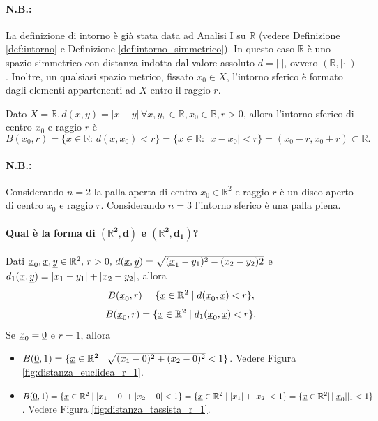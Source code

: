 \paragraph{N.B.:} La definizione di intorno è già stata data ad Analisi I su $\mathbb R$ (vedere Definizione \ref{def:intorno} e Definizione \ref{def:intorno_simmetrico}). In questo caso $\mathbb R$ è uno spazio simmetrico con distanza indotta dal valore assoluto $d=|\cdot|$, ovvero $(\mathbb R,|\cdot|)$. Inoltre, un qualsiasi spazio metrico, fissato $x_0\in X$, l'intorno sferico è formato dagli elementi appartenenti ad $X$ entro il raggio $r$.

\begin{example}
    Dato $X=\mathbb R.\, d(x,y)=|x-y|\,\forall x,y,\in\mathbb R, x_0\in\mathbb B, r>0$, allora l'intorno sferico di centro $x_0$ e raggio $r$ è
    \begin{equation*}
        B(x_0,r)=\{x\in\mathbb R\colon\,d(x,x_0)<r\}=\{x\in\mathbb R\colon\,|x-x_0|<r\}=(x_0 - r, x_0 + r)\subset\mathbb R.
    \end{equation*}
\end{example}

\paragraph{N.B.:} Considerando $n=2$ la palla aperta di centro $x_0\in\mathbb R^2$ e raggio $r$ è un disco aperto di centro $x_0$ e raggio $r$. Considerando $n=3$ l'intorno sferico è una palla piena.

\paragraph{Qual è la forma di $\boldsymbol{(\mathbb R^2, d)}$ e $\boldsymbol{(\mathbb R^2, d_1)}$?}
Dati $\uline x_0, \uline x, \uline y\in\mathbb R^2,\, r>0,\, d(\uline x, \uline y)=\sqrt{(\uline x_1-y_1)^2-(x_2-y_2)2}$ e $ d_1(\uline x,\uline y)=|x_1-y_1|+|x_2-y_2|$, allora 
\begin{equation*}
    B(\uline x_0,r)=\{\uline x\in\mathbb R^2\; | \; d(\uline x_0, \uline x)<r\},
\end{equation*}
\begin{equation*}
    B(\uline x_0,r)=\{\uline x\in\mathbb R^2\; |\; d_1(\uline x_0, \uline x)<r\}.
\end{equation*}
Se $\uline x_0=\uline 0$ e $r=1$, allora
\begin{itemize}
    \item $B(\uline 0, 1)=\{\uline x\in\mathbb R^2\; |\;\sqrt{(x_1-0)^2+(x_2-0)^2}<1\}$. Vedere Figura \ref{fig:distanza_euclidea_r_1}.
    \item $B(\uline 0, 1)=\{\uline x\in\mathbb R^2\; |\; |x_1-0|+|x_2-0|<1\}=\{\uline x\in\mathbb R^2\; |\;|x_1|+|x_2|<1\}=\{\uline x\in\mathbb R^2|\,||\uline x_0||_1<1\}$. Vedere Figura \ref{fig:distanza_tassista_r_1}.
\end{itemize}

